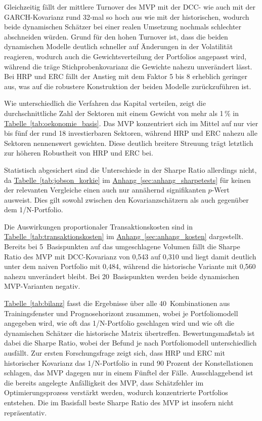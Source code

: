 \documentclass[a4paper, 12pt]{article}
\begin{document}
Gleichzeitig fällt der mittlere Turnover des MVP mit der DCC- wie auch mit der GARCH-Kovarianz rund 32-mal so hoch aus wie mit der historischen, wodurch beide dynamischen Schätzer bei einer realen Umsetzung nochmals schlechter abschneiden würden.
Grund für den hohen Turnover ist, dass die beiden dynamischen Modelle deutlich schneller auf Änderungen in der Volatilität reagieren, wodurch auch die Gewichtsverteilung der Portfolios angepasst wird, während die träge Stichprobenkovarianz die Gewichte nahezu unverändert lässt.
Bei HRP und ERC fällt der Anstieg mit dem Faktor 5 bis 8 erheblich geringer aus, was auf die robustere Konstruktion der beiden Modelle zurückzuführen ist.

Wie unterschiedlich die Verfahren das Kapital verteilen, zeigt die durchschnittliche Zahl der Sektoren mit einem Gewicht von mehr als 1\,\% in \hyperref[tab:oekonomie_basis]{Tabelle~\ref*{tab:oekonomie_basis}}. Das MVP konzentriert sich im Mittel auf nur vier bis fünf der rund 18 investierbaren Sektoren, während HRP und ERC nahezu alle Sektoren nennenswert gewichten. Diese deutlich breitere Streuung trägt letztlich zur höheren Robustheit von HRP und ERC bei.

Statistisch abgesichert sind die Unterschiede in der Sharpe Ratio allerdings nicht, da \hyperref[tab:jobson_korkie]{Tabelle~\ref*{tab:jobson_korkie}} im \hyperref[sec:anhang_sharpetests]{Anhang~\ref*{sec:anhang_sharpetests}} für keinen der relevanten Vergleiche einen auch nur annähernd signifikanten $p$-Wert ausweist.
Dies gilt sowohl zwischen den Kovarianzschätzern als auch gegenüber dem 1/N-Portfolio.

Die Auswirkungen proportionaler Transaktionskosten sind in \hyperref[tab:transaktionskosten]{Tabelle~\ref*{tab:transaktionskosten}} im \hyperref[sec:anhang_kosten]{Anhang~\ref*{sec:anhang_kosten}} dargestellt.
Bereits bei 5~Basispunkten auf das umgeschlagene Volumen fällt die Sharpe Ratio des MVP mit DCC-Kovarianz von 0,543 auf 0,310 und liegt damit deutlich unter dem naiven Portfolio mit 0,484, während die historische Variante mit 0,560 nahezu unverändert bleibt.
Bei 20~Basispunkten werden beide dynamischen MVP-Varianten negativ.

\hyperref[tab:bilanz]{Tabelle~\ref*{tab:bilanz}} fasst die Ergebnisse über alle 40~Kombinationen aus Trainingsfenster und Prognosehorizont zusammen, wobei je Portfoliomodell angegeben wird, wie oft das 1/N-Portfolio geschlagen wird und wie oft die dynamischen Schätzer die historische Matrix übertreffen.
Bewertungsmaßstab ist dabei die Sharpe Ratio, wobei der Befund je nach Portfoliomodell unterschiedlich ausfällt.
Zur ersten Forschungsfrage zeigt sich, dass HRP und ERC mit historischer Kovarianz das 1/N-Portfolio in rund 90 Prozent der Konstellationen schlagen, das MVP dagegen nur in einem Fünftel der Fälle.
Ausschlaggebend ist die bereits angelegte Anfälligkeit des MVP, dass Schätzfehler im Optimierungsprozess verstärkt werden, wodurch konzentrierte Portfolios entstehen.
Die im Basisfall beste Sharpe Ratio des MVP ist insofern nicht repräsentativ.
\end{document}
